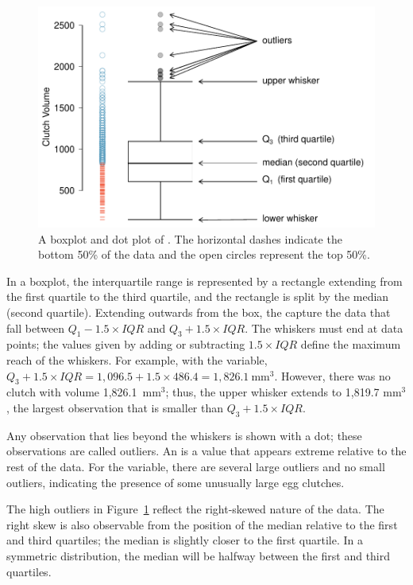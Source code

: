 \begin{figure}[th]
	\centering
	\includegraphics[width=0.95\mycaptionwidth]{ch_intro_to_data_oi_biostat/figures/frogBoxPlot/frogBoxPlot}
	\caption{A boxplot and dot plot of . The horizontal dashes indicate the bottom 50\% of the data and the open circles represent the top 50\%.}
	\label{frogBoxPlot}
\end{figure}

\textD{\newpage}

In a boxplot, the interquartile range is represented by a rectangle extending from the first quartile to the third quartile, and the rectangle is split by the median (second quartile). Extending outwards from the box, the  capture the data that fall between $Q_1 - 1.5\times IQR$ and $Q_3 + 1.5\times IQR$. The whiskers must end at data points; the values given by adding or subtracting $1.5\times IQR$ define the maximum reach of the whiskers. For example, with the  variable, $Q_3 + 1.5 \times IQR = 1,096.5 + 1.5\times 486.4 = 1,826.1\ \textrm {mm}^{3}$. However, there was no clutch with volume 1,826.1\ $\textrm {mm}^{3}$; thus, the upper whisker extends to 1,819.7 $\textrm {mm}^{3}$, the largest observation that is smaller than $Q_3 + 1.5\times IQR$.

Any observation that lies beyond the whiskers is shown with a dot; these observations are called outliers. An  is a value that appears extreme relative to the rest of the data. For the  variable, there are several large outliers and no small outliers, indicating the presence of some unusually large egg clutches.

The high outliers in Figure~\ref{frogBoxPlot} reflect the right-skewed nature of the data. The right skew is also observable from the position of the median relative to the first and third quartiles; the median is slightly closer to the first quartile. In a symmetric distribution, the median will be halfway between the first and third quartiles.


